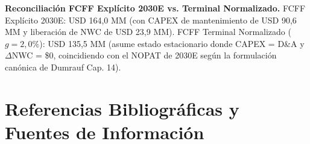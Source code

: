 \documentclass[10pt,a4paper]{article}
\begin{document}
\noindent
{\small \textbf{Reconciliación FCFF Explícito 2030E vs. Terminal Normalizado.} FCFF Explícito 2030E: USD 164,0 MM (con CAPEX de mantenimiento de USD 90,6 MM y liberación de NWC de USD 23,9 MM). FCFF Terminal Normalizado ($g = 2,0\%$): USD 135,5 MM (asume estado estacionario donde CAPEX = D\&A y $\Delta$NWC = \$0, coincidiendo con el NOPAT de 2030E según la formulación canónica de Dumrauf Cap. 14).\par}

\clearpage

\section*{Referencias Bibliográficas y Fuentes de Información}
\end{document}
